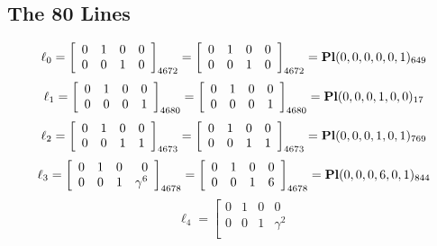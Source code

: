 \documentclass{article}
\begin{document}
{\subsection*{The 80 Lines}
$$
\ell_{0} = 
\left[
\begin{array}{*{4}{r}}
0 & 1 & 0 & 0\\
0 & 0 & 1 & 0\\
\end{array}
\right]
_{4672}
=
\left[
\begin{array}{*{4}c}
0  & 1  & 0  & 0\\
0  & 0  & 1  & 0\\
\end{array}
\right]_{4672}
={\rm\bf Pl}(0,0,0,0,0,1 )_{649}$$
$$
\ell_{1} = 
\left[
\begin{array}{*{4}{r}}
0 & 1 & 0 & 0\\
0 & 0 & 0 & 1\\
\end{array}
\right]
_{4680}
=
\left[
\begin{array}{*{4}c}
0  & 1  & 0  & 0\\
0  & 0  & 0  & 1\\
\end{array}
\right]_{4680}
={\rm\bf Pl}(0,0,0,1,0,0 )_{17}$$
$$
\ell_{2} = 
\left[
\begin{array}{*{4}{r}}
0 & 1 & 0 & 0\\
0 & 0 & 1 & 1\\
\end{array}
\right]
_{4673}
=
\left[
\begin{array}{*{4}c}
0  & 1  & 0  & 0\\
0  & 0  & 1  & 1\\
\end{array}
\right]_{4673}
={\rm\bf Pl}(0,0,0,1,0,1 )_{769}$$
$$
\ell_{3} = 
\left[
\begin{array}{*{4}{r}}
0 & 1 & 0 & 0\\
0 & 0 & 1 & \gamma^{6}\\
\end{array}
\right]
_{4678}
=
\left[
\begin{array}{*{4}c}
0  & 1  & 0  & 0\\
0  & 0  & 1  & 6\\
\end{array}
\right]_{4678}
={\rm\bf Pl}(0,0,0,6,0,1 )_{844}$$
$$
\ell_{4} = 
\left[
\begin{array}{*{4}{r}}
0 & 1 & 0 & 0\\
0 & 0 & 1 & \gamma^{2}\\

\end{array}$$}
\end{document}
